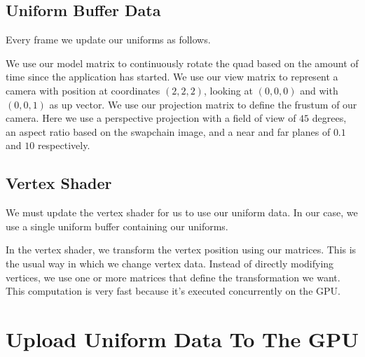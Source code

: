 \subsection{Uniform Buffer Data}

Every frame we update our uniforms as follows.

\begin{minipage}{\linewidth}{\noindent}
    
\end{minipage}

We use our model matrix to continuously rotate the quad based on the
amount of time since the application has started.
We use our view matrix to represent a camera with position at coordinates
$(2, 2, 2)$, looking at $(0, 0, 0)$ and with $(0, 0, 1)$ as up vector.
We use our projection matrix to define the frustum of our camera.
Here we use a perspective projection with a field of view of $45$ degrees,
an aspect ratio based on the swapchain image, and a near and far planes of
$0.1$ and $10$ respectively.

\subsection{Vertex Shader}

We must update the vertex shader for us to use our uniform data.
In our case, we use a single uniform buffer containing our uniforms.

\begin{minipage}{\linewidth}{\noindent}
    
\end{minipage}

In the vertex shader, we transform the vertex position using our matrices.
This is the usual way in which we change vertex data.
Instead of directly modifying vertices, we use one or more matrices
that define the transformation we want.
This computation is very fast because it's executed concurrently on the GPU.

\section{Upload Uniform Data To The GPU}

